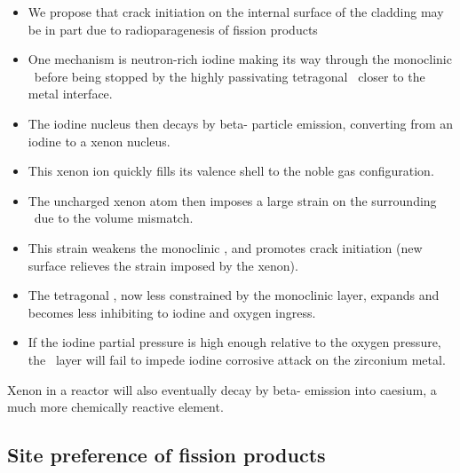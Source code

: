 \begin{itemize}
\item We propose that crack initiation on the internal surface of the cladding may be in part due to radioparagenesis of fission products
\item One mechanism is neutron-rich iodine making its way through the monoclinic \zirconia\ before being stopped by the highly passivating tetragonal \zirconia\ closer to the metal interface.
\item The iodine nucleus then decays by beta- particle emission, converting from an iodine to a xenon nucleus.
\item This xenon ion quickly fills its valence shell to the noble gas configuration.
\item The uncharged xenon atom then imposes a large strain on the surrounding \zirconia\ due to the volume mismatch.
\item This strain weakens the monoclinic \zirconia , and promotes crack initiation (new surface relieves the strain imposed by the xenon).
\item The tetragonal \zirconia , now less constrained by the monoclinic layer, expands and becomes less inhibiting to iodine and oxygen ingress.
\item If the iodine partial pressure is high enough relative to the oxygen pressure, the \zirconia\ layer will fail to impede iodine corrosive attack on the zirconium metal.
\end{itemize}

Xenon in a reactor will also eventually decay by beta- emission into caesium, a much more chemically reactive element.

\subsection{Site preference of fission products}

